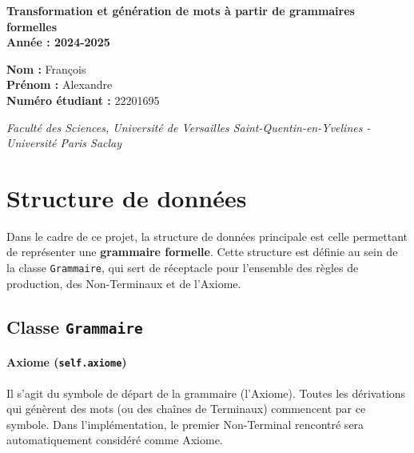 \documentclass[a4paper,12pt]{article}
\newcommand{\bigtitle}[1]{
    \begin{center}
        \vspace*{5cm} 
        {\Huge \bfseries #1}\\
        \vspace{0.5cm}
        {\large \textbf{Année : 2024-2025}}
        \vspace{1cm}
    \end{center}
}
\begin{document}
\bigtitle{Transformation et génération de mots à partir de grammaires formelles}

\begin{center}
    \Large
    \textbf{Nom :} François \\
    \textbf{Prénom :} Alexandre \\
    \textbf{Numéro étudiant :} 22201695 \\
\end{center}

\vfill

\begin{center}
    \textit{Faculté des Sciences, Université de Versailles Saint-Quentin-en-Yvelines - Université Paris Saclay}
\end{center}

\newpage

\tableofcontents
\newpage

\section{Structure de données}
\label{sec:structure-donnees}

Dans le cadre de ce projet, la structure de données principale est celle permettant de représenter une \textbf{grammaire formelle}. Cette structure est définie au sein de la classe \texttt{Grammaire}, qui sert de réceptacle pour l’ensemble des règles de production, 
des Non-Terminaux et de l’Axiome.

\subsection{Classe \texttt{Grammaire}}
\label{subsec:classe-grammaire}

\paragraph{Axiome (\texttt{self.axiome})}
Il s’agit du symbole de départ de la grammaire (l’Axiome). Toutes les dérivations qui génèrent des mots (ou des chaînes de Terminaux) commencent par ce symbole. Dans l’implémentation, le premier Non-Terminal rencontré sera automatiquement considéré comme Axiome.
\end{document}
